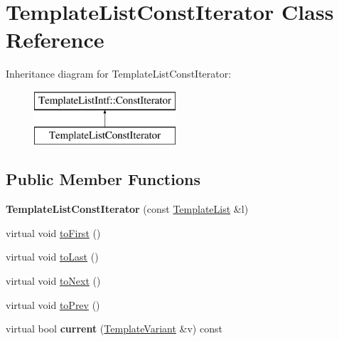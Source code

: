 \hypertarget{class_template_list_const_iterator}{}\section{Template\+List\+Const\+Iterator Class Reference}
\label{class_template_list_const_iterator}
Inheritance diagram for Template\+List\+Const\+Iterator\+:\begin{figure}[H]
\begin{center}
\leavevmode
\includegraphics[height=2.000000cm]{class_template_list_const_iterator}
\end{center}
\end{figure}
\subsection*{Public Member Functions}
\begin{DoxyCompactItemize}
\item 
\mbox{\label{class_template_list_const_iterator_aceec15491e253e785a15e6756c38d26a}} 
{\bfseries Template\+List\+Const\+Iterator} (const \mbox{\hyperlink{class_template_list}{Template\+List}} \&l)
\item 
virtual void \mbox{\hyperlink{class_template_list_const_iterator_aa0478c27f8d663f5fb09a89b6875cec5}{to\+First}} ()
\item 
virtual void \mbox{\hyperlink{class_template_list_const_iterator_abe543d04737d13d0dbdec99b4019f036}{to\+Last}} ()
\item 
virtual void \mbox{\hyperlink{class_template_list_const_iterator_ab7681f11844471c2522984d3e2101d24}{to\+Next}} ()
\item 
virtual void \mbox{\hyperlink{class_template_list_const_iterator_a80276f5474320de67b93f287cdd6cd79}{to\+Prev}} ()
\item 
\mbox{\label{class_template_list_const_iterator_a8fc2aa67f32f90652fb89f9493dbab73}} 
virtual bool {\bfseries current} (\mbox{\hyperlink{class_template_variant}{Template\+Variant}} \&v) const
\end{DoxyCompactItemize}


